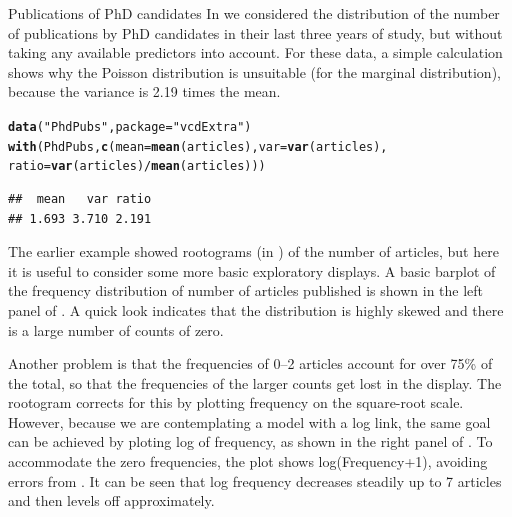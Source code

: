 \documentclass[11pt]{book}\usepackage[]{graphicx}\usepackage[]{color}
\makeatletter
\newcommand{\hlstr}[1]{\textcolor[rgb]{0.192,0.494,0.8}{#1}}%
\newcommand{\hlopt}[1]{\textcolor[rgb]{0,0,0}{#1}}%
\newcommand{\hlstd}[1]{\textcolor[rgb]{0.345,0.345,0.345}{#1}}%
\newcommand{\hlkwc}[1]{\textcolor[rgb]{0.333,0.667,0.333}{#1}}%
\newcommand{\hlkwd}[1]{\textcolor[rgb]{0.737,0.353,0.396}{\textbf{#1}}}%
\newenvironment{kframe}{%
 \def\at@end@of@kframe{}%
 \ifinner\ifhmode%
  \def\at@end@of@kframe{\end{minipage}}%
  \begin{minipage}{\columnwidth}%
 \fi\fi%
 \def\FrameCommand##1{\hskip\@totalleftmargin \hskip-\fboxsep
 \colorbox{shadecolor}{##1}\hskip-\fboxsep
     \hskip-\linewidth \hskip-\@totalleftmargin \hskip\columnwidth}%
 \MakeFramed {\advance\hsize-\width
   \@totalleftmargin\z@ \linewidth\hsize
   \@setminipage}}%
 {\par\unskip\endMakeFramed%
 \at@end@of@kframe}
\newenvironment{knitrout}{}{} %
\renewenvironment{knitrout}{\small\renewcommand{\baselinestretch}{.85}}{} %
\makeatother
\begin{document}
\begin{Example}[phdpubs1]{Publications of PhD candidates}
In  we considered the distribution of the number of 
publications by PhD candidates in their last three years of study,
but without taking any available predictors into account. 
For these data, a simple calculation shows why the Poisson distribution
is unsuitable (for the marginal distribution), because the variance is 2.19 times the mean.

\begin{knitrout}
\color{fgcolor}\begin{kframe}
\begin{alltt}
\hlkwd{data}\hlstd{(}\hlstr{"PhdPubs"}\hlstd{,} \hlkwc{package}\hlstd{=}\hlstr{"vcdExtra"}\hlstd{)}
\hlkwd{with}\hlstd{(PhdPubs,} \hlkwd{c}\hlstd{(}\hlkwc{mean}\hlstd{=}\hlkwd{mean}\hlstd{(articles),} \hlkwc{var}\hlstd{=}\hlkwd{var}\hlstd{(articles),}
                \hlkwc{ratio}\hlstd{=}\hlkwd{var}\hlstd{(articles)}\hlopt{/}\hlkwd{mean}\hlstd{(articles)))}
\end{alltt}
\begin{verbatim}
##  mean   var ratio 
## 1.693 3.710 2.191
\end{verbatim}
\end{kframe}
\end{knitrout}
The earlier example showed rootograms (in )
of the number of articles, but here it is useful to consider some more
basic exploratory displays.  A basic barplot of the frequency distribution
of number of articles published is shown in the left panel of
.  A quick look indicates that the distribution
is highly skewed and there is a large number of counts of zero.

Another problem is that the frequencies of 0--2 articles account for 
over 75\% of the total, so that the frequencies of the larger counts
get lost in the display.  The rootogram corrects for this by plotting
frequency on the square-root scale.  However, because we are contemplating
a model with a log link, the same goal can be achieved by ploting
log of frequency, as shown in the right panel of .
To accommodate the zero frequencies, the plot shows log(Frequency+1),
avoiding errors from .
It can be seen that log frequency decreases steadily up to 7 articles and
then levels off approximately.


\end{Example}
\end{document}
